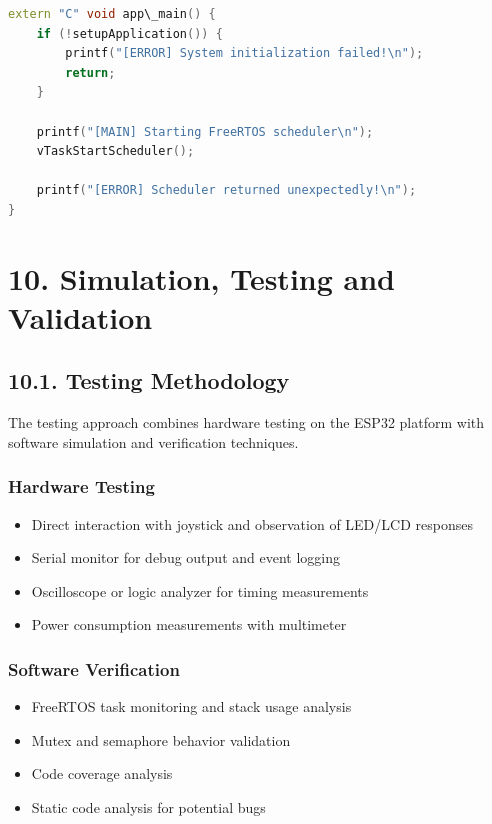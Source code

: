 \documentclass[12pt]{article}
\begin{document}
\begin{lstlisting}[language=C++, caption=Main Application (main.cpp)]
extern "C" void app\_main() {
    if (!setupApplication()) {
        printf("[ERROR] System initialization failed!\n");
        return;
    }
    
    printf("[MAIN] Starting FreeRTOS scheduler\n");
    vTaskStartScheduler();
    
    printf("[ERROR] Scheduler returned unexpectedly!\n");
}
\end{lstlisting}

\section*{10. Simulation, Testing and Validation}

\subsection*{10.1. Testing Methodology}

The testing approach combines hardware testing on the ESP32 platform with software simulation and verification techniques.

\subsubsection*{Hardware Testing}

\begin{itemize}
    \item Direct interaction with joystick and observation of LED/LCD responses
    \item Serial monitor for debug output and event logging
    \item Oscilloscope or logic analyzer for timing measurements
    \item Power consumption measurements with multimeter
\end{itemize}

\subsubsection*{Software Verification}

\begin{itemize}
    \item FreeRTOS task monitoring and stack usage analysis
    \item Mutex and semaphore behavior validation
    \item Code coverage analysis
    \item Static code analysis for potential bugs
\end{itemize}
\end{document}

